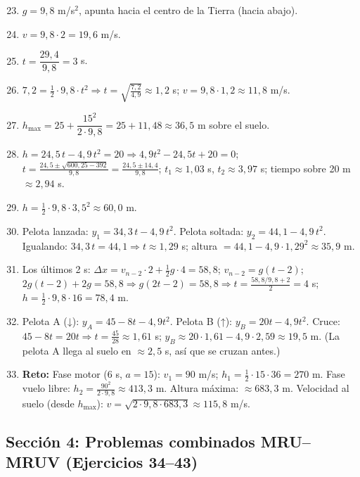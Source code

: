 \documentclass[12pt, letterpaper]{article}
\begin{document}
  \begin{enumerate}[leftmargin=*, label=\textbf{\arabic*.}]
    \setcounter{enumi}{22}
    \item $g = 9{,}8$ m/s$^2$, apunta hacia el centro de la Tierra (hacia abajo).
    \item $v = 9{,}8 \cdot 2 = 19{,}6$ m/s.
    \item $t = \dfrac{29{,}4}{9{,}8} = 3$ s.
    \item $7{,}2 = \tfrac{1}{2} \cdot 9{,}8 \cdot t^2 \Rightarrow t = \sqrt{\frac{7{,}2}{4{,}9}} \approx 1{,}2$ s; $v = 9{,}8 \cdot 1{,}2 \approx 11{,}8$ m/s.
    \item $h_{\max} = 25 + \dfrac{15^2}{2 \cdot 9{,}8} = 25 + 11{,}48 \approx 36{,}5$ m sobre el suelo.
    \item $h = 24{,}5\,t - 4{,}9\,t^2 = 20 \Rightarrow 4{,}9t^2 - 24{,}5t + 20 = 0$; $t = \frac{24{,}5 \pm \sqrt{600{,}25 - 392}}{9{,}8} = \frac{24{,}5 \pm 14{,}4}{9{,}8}$; $t_1 \approx 1{,}03$ s, $t_2 \approx 3{,}97$ s; tiempo sobre 20 m $\approx 2{,}94$ s.
    \item $h = \tfrac{1}{2} \cdot 9{,}8 \cdot 3{,}5^2 \approx 60{,}0$ m.
    \item Pelota lanzada: $y_1 = 34{,}3\,t - 4{,}9\,t^2$. Pelota soltada: $y_2 = 44{,}1 - 4{,}9\,t^2$. Igualando: $34{,}3\,t = 44{,}1 \Rightarrow t \approx 1{,}29$ s; altura $= 44{,}1 - 4{,}9 \cdot 1{,}29^2 \approx 35{,}9$ m.
    \item Los últimos 2 s: $\Delta x = v_{n-2} \cdot 2 + \tfrac{1}{2}g \cdot 4 = 58{,}8$; $v_{n-2} = g(t-2)$; $2g(t-2) + 2g = 58{,}8 \Rightarrow g(2t-2) = 58{,}8 \Rightarrow t = \frac{58{,}8/9{,}8 + 2}{2} = 4$ s; $h = \tfrac{1}{2} \cdot 9{,}8 \cdot 16 = 78{,}4$ m.
    \item Pelota A (↓): $y_A = 45 - 8t - 4{,}9t^2$. Pelota B (↑): $y_B = 20t - 4{,}9t^2$. Cruce: $45 - 8t = 20t \Rightarrow t = \frac{45}{28} \approx 1{,}61$ s; $y_B \approx 20 \cdot 1{,}61 - 4{,}9 \cdot 2{,}59 \approx 19{,}5$ m. (La pelota A llega al suelo en $\approx 2{,}5$ s, así que se cruzan antes.)
    \item \textbf{Reto:} Fase motor ($6$ s, $a=15$): $v_1 = 90$ m/s; $h_1 = \tfrac{1}{2} \cdot 15 \cdot 36 = 270$ m. Fase vuelo libre: $h_2 = \frac{90^2}{2 \cdot 9{,}8} \approx 413{,}3$ m. Altura máxima: $\approx 683{,}3$ m. Velocidad al suelo (desde $h_{\max}$): $v = \sqrt{2 \cdot 9{,}8 \cdot 683{,}3} \approx 115{,}8$ m/s.
  \end{enumerate}

  \subsection*{Sección 4: Problemas combinados MRU--MRUV (Ejercicios 34--43)}
\end{document}
